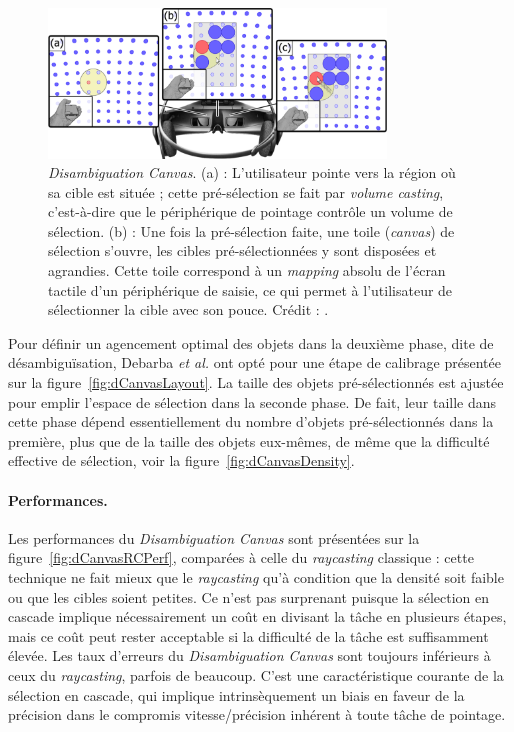 	\begin{figure}[!htbp]
		\centering
		\includegraphics[width=0.8\textwidth]{figures/ch2/dCanvas}
		\caption[\emph{Disambiguation Canvas}]{\emph{Disambiguation Canvas}. (a) : L'utilisateur pointe vers la région où sa cible est située ; cette pré-sélection se fait par \emph{volume casting}, c'est-à-dire que le périphérique de pointage contrôle un volume de sélection. (b) : Une fois la pré-sélection faite, une \og toile \fg{} (\emph{canvas}) de sélection s'ouvre, les cibles pré-sélectionnées y sont disposées et agrandies. Cette toile correspond à un \emph{mapping} absolu de l'écran tactile d'un périphérique de saisie, ce qui permet à l'utilisateur de sélectionner la cible avec son pouce. Crédit : \cite{debarba2013disambiguation}.}
		\label{fig:dCanvas}
	\end{figure}
		
	Pour définir un agencement optimal des objets dans la deuxième phase, dite de désambiguïsation, Debarba \emph{et al.} ont opté pour une étape de calibrage présentée sur la figure~\ref{fig:dCanvasLayout}. La taille des objets pré-sélectionnés est ajustée pour emplir l'espace de sélection dans la seconde phase. De fait, leur taille dans cette phase dépend essentiellement du nombre d'objets pré-sélectionnés dans la première, plus que de la taille des objets eux-mêmes, de même que la difficulté effective de sélection, voir la figure~\ref{fig:dCanvasDensity}.
		
	\paragraph{Performances.}
	Les performances du \emph{Disambiguation Canvas} sont présentées sur la figure~\ref{fig:dCanvasRCPerf}, comparées à celle du \emph{raycasting} classique : cette technique ne fait mieux que le \emph{raycasting} qu'à condition que la densité soit faible ou que les cibles soient petites. Ce n'est pas surprenant puisque la sélection en cascade implique nécessairement un coût en divisant la tâche en plusieurs étapes, mais ce coût peut rester acceptable si la difficulté de la tâche est suffisamment élevée. Les taux d'erreurs du \emph{Disambiguation Canvas} sont toujours inférieurs à ceux du \emph{raycasting}, parfois de beaucoup. C'est une caractéristique courante de la sélection en cascade, qui implique intrinsèquement un biais en faveur de la précision dans le compromis vitesse/précision inhérent à toute tâche de pointage.
	
